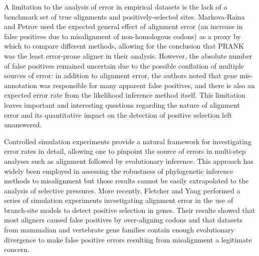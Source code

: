 \documentclass{mbe}
\begin{document}
A limitation to the analysis of error in empirical datasets is the
lack of a benchmark set of true alignments and positively-selected
sites. Markova-Raina and Petrov \citeyearpar{Markova-Raina2011High}
used the expected general effect of alignment error (an increase in
false positives due to misalignment of non-homologous codons) as a
proxy by which to compare different methods, allowing for the
conclusion that PRANK was the least error-prone aligner in their
analysis. However, the absolute number of false positives remained
uncertain due to the possible conflation of multiple sources of error:
in addition to alignment error, the authors noted that gene
mis-annotation was responsible for many apparent false positives, and
there is also an expected error rate from the likelihood inference
method itself. This limitation leaves important and interesting
questions regarding the nature of alignment error and its quantitative
impact on the detection of positive selection left unanswered.

Controlled simulation experiments provide a natural framework for
investigating error rates in detail, allowing one to pinpoint the
source of errors in multi-step analyses such as alignment followed by
evolutionary inference. This approach has widely been employed in
assessing the robustness of phylogenetic inference methods to
misalignment
\citep{Dwivedi2009Phylogenetic,Ogden2006Multiple,Loytynoja2008PhylogenyAware}
but those results cannot be easily extrapolated to the analysis of \sw
selective pressures. More recently, Fletcher and Yang
\citeyearpar{Fletcher2010Effect} performed a series of simulation
experiments investigating alignment error in the use of branch-site
models to detect positive selection in genes. Their results showed
that most aligners caused false positives by over-aligning codons and
that datasets from mammalian and vertebrate gene families contain
enough evolutionary divergence to make false positive errors resulting
from misalignment a legitimate concern.
\end{document}
